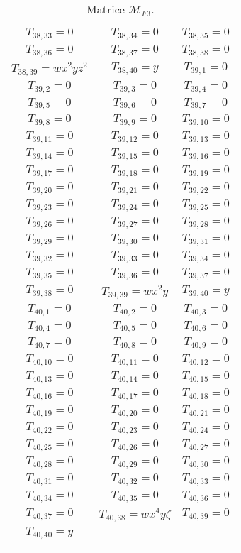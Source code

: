 \documentclass[12pt]{memoireuqam1.3}
\begin{document}
\begin{longtable}{|c|c|c|}
$T_{38,33}= 0$&
$T_{38,34}= 0$&
$T_{38,35}= 0$\\
$T_{38,36}= 0$&
$T_{38,37}= 0$&
$T_{38,38}= 0$\\
$T_{38,39}= wx^2yz^2$&
$T_{38,40}= y$&
$T_{39,1}= 0$\\
$T_{39,2}= 0$&
$T_{39,3}= 0$&
$T_{39,4}= 0$\\
$T_{39,5}= 0$&
$T_{39,6}= 0$&
$T_{39,7}= 0$\\
$T_{39,8}= 0$&
$T_{39,9}= 0$&
$T_{39,10}= 0$\\
$T_{39,11}= 0$&
$T_{39,12}= 0$&
$T_{39,13}= 0$\\
$T_{39,14}= 0$&
$T_{39,15}= 0$&
$T_{39,16}= 0$\\
$T_{39,17}= 0$&
$T_{39,18}= 0$&
$T_{39,19}= 0$\\
$T_{39,20}= 0$&
$T_{39,21}= 0$&
$T_{39,22}= 0$\\
$T_{39,23}= 0$&
$T_{39,24}= 0$&
$T_{39,25}= 0$\\
$T_{39,26}= 0$&
$T_{39,27}= 0$&
$T_{39,28}= 0$\\
$T_{39,29}= 0$&
$T_{39,30}= 0$&
$T_{39,31}= 0$\\
$T_{39,32}= 0$&
$T_{39,33}= 0$&
$T_{39,34}= 0$\\
$T_{39,35}= 0$&
$T_{39,36}= 0$&
$T_{39,37}= 0$\\
$T_{39,38}= 0$&
$T_{39,39}= wx^2y$&
$T_{39,40}= y$\\
$T_{40,1}= 0$&
$T_{40,2}= 0$&
$T_{40,3}= 0$\\
$T_{40,4}= 0$&
$T_{40,5}= 0$&
$T_{40,6}= 0$\\
$T_{40,7}= 0$&
$T_{40,8}= 0$&
$T_{40,9}= 0$\\
$T_{40,10}= 0$&
$T_{40,11}= 0$&
$T_{40,12}= 0$\\
$T_{40,13}= 0$&
$T_{40,14}= 0$&
$T_{40,15}= 0$\\
$T_{40,16}= 0$&
$T_{40,17}= 0$&
$T_{40,18}= 0$\\
$T_{40,19}= 0$&
$T_{40,20}= 0$&
$T_{40,21}= 0$\\
$T_{40,22}= 0$&
$T_{40,23}= 0$&
$T_{40,24}= 0$\\
$T_{40,25}= 0$&
$T_{40,26}= 0$&
$T_{40,27}= 0$\\
$T_{40,28}= 0$&
$T_{40,29}= 0$&
$T_{40,30}= 0$\\
$T_{40,31}= 0$&
$T_{40,32}= 0$&
$T_{40,33}= 0$\\
$T_{40,34}= 0$&
$T_{40,35}= 0$&
$T_{40,36}= 0$\\
$T_{40,37}= 0$&
$T_{40,38}= wx^4y\zeta$&
$T_{40,39}= 0$\\
$T_{40,40}= y$&\\
\hline
\caption{\label{tab2} Matrice $\mathcal{M}_{F3}$.}
\end{longtable} 
\end{document}
